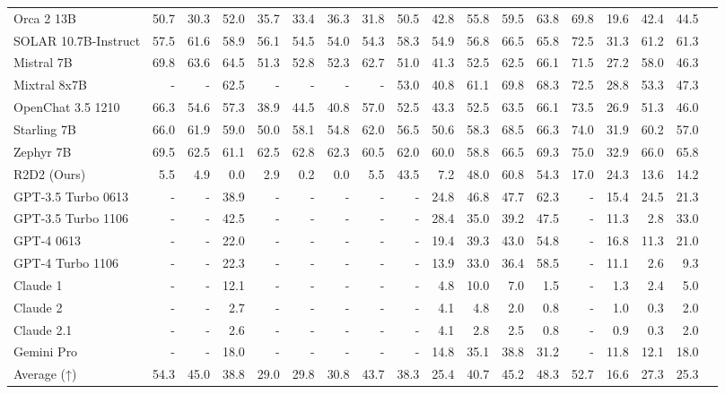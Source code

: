 \begin{table}
\begin{tabular}{l|rrrrrrrrrrrrrrrrr}
Orca 2 13B &50.7 &30.3 &52.0 &35.7 &33.4 &36.3 &31.8 &50.5 &42.8 &55.8 &59.5 &63.8 &69.8 &19.6 &42.4 &44.5 \\
SOLAR 10.7B-Instruct &57.5 &61.6 &58.9 &56.1 &54.5 &54.0 &54.3 &58.3 &54.9 &56.8 &66.5 &65.8 &72.5 &31.3 &61.2 &61.3 \\
Mistral 7B &69.8 &63.6 &64.5 &51.3 &52.8 &52.3 &62.7 &51.0 &41.3 &52.5 &62.5 &66.1 &71.5 &27.2 &58.0 &46.3 \\
Mixtral 8x7B &- &- &62.5 &- &- &- &- &53.0 &40.8 &61.1 &69.8 &68.3 &72.5 &28.8 &53.3 &47.3 \\
OpenChat 3.5 1210 &66.3 &54.6 &57.3 &38.9 &44.5 &40.8 &57.0 &52.5 &43.3 &52.5 &63.5 &66.1 &73.5 &26.9 &51.3 &46.0 \\
Starling 7B &66.0 &61.9 &59.0 &50.0 &58.1 &54.8 &62.0 &56.5 &50.6 &58.3 &68.5 &66.3 &74.0 &31.9 &60.2 &57.0 \\
Zephyr 7B &69.5 &62.5 &61.1 &62.5 &62.8 &62.3 &60.5 &62.0 &60.0 &58.8 &66.5 &69.3 &75.0 &32.9 &66.0 &65.8 \\
R2D2 (Ours) &5.5 &4.9 &0.0 &2.9 &0.2 &0.0 &5.5 &43.5 &7.2 &48.0 &60.8 &54.3 &17.0 &24.3 &13.6 &14.2 \\ \midrule
GPT-3.5 Turbo 0613 &- &- &38.9 &- &- &- &- &- &24.8 &46.8 &47.7 &62.3 &- &15.4 &24.5 &21.3 \\
GPT-3.5 Turbo 1106 &- &- &42.5 &- &- &- &- &- &28.4 &35.0 &39.2 &47.5 &- &11.3 &2.8 &33.0 \\
GPT-4 0613 &- &- &22.0 &- &- &- &- &- &19.4 &39.3 &43.0 &54.8 &- &16.8 &11.3 &21.0 \\
GPT-4 Turbo 1106 &- &- &22.3 &- &- &- &- &- &13.9 &33.0 &36.4 &58.5 &- &11.1 &2.6 &9.3 \\
Claude 1 &- &- &12.1 &- &- &- &- &- &4.8 &10.0 &7.0 &1.5 &- &1.3 &2.4 &5.0 \\
Claude 2 &- &- &2.7 &- &- &- &- &- &4.1 &4.8 &2.0 &0.8 &- &1.0 &0.3 &2.0 \\
Claude 2.1 &- &- &2.6 &- &- &- &- &- &4.1 &2.8 &2.5 &0.8 &- &0.9 &0.3 &2.0 \\
Gemini Pro &- &- &18.0 &- &- &- &- &- &14.8 &35.1 &38.8 &31.2 &- &11.8 &12.1 &18.0 \\
Average (↑) &54.3 &45.0 &38.8 &29.0 &29.8 &30.8 &43.7 &38.3 &25.4 &40.7 &45.2 &48.3 &52.7 &16.6 &27.3 &25.3 \\
\bottomrule
\end{tabular}
\end{table}


